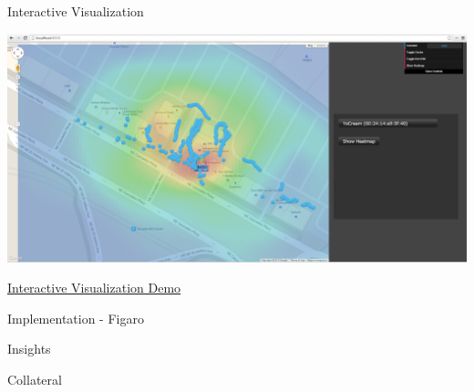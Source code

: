\documentclass[11pt]{beamer}
\begin{document}
\begin{frame}{Interactive Visualization}

\includegraphics[height=0.55\textheight]{pictures/screenshot4.png}

\href{http://localhost:8000/}{Interactive Visualization Demo}

\end{frame}

\begin{frame}{Implementation - Figaro}

\end{frame}

\begin{frame}{Insights}

\end{frame}

\begin{frame}{Collateral}

\end{frame}
\end{document}
